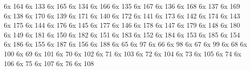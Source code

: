 \characterdef \cyrshha      6x  164
\characterdef \CYRZHDSC     6x  133
\characterdef \cyrzhdsc     6x  165
\characterdef \CYRZDSC      6x  134
\characterdef \cyrzdsc      6x  166
\characterdef \CYRABHDZE    6x  135
\characterdef \cyrabhdze    6x  167
\characterdef \CYRYI        6x  136
\characterdef \cyryi        6x  168
\characterdef \CYRKDSC      6x  137
\characterdef \cyrkdsc      6x  169
\characterdef \CYRKBEAK     6x  138
\characterdef \cyrkbeak     6x  170
\characterdef \CYRKHK       6x  139
\characterdef \cyrkhk       6x  171
\characterdef \CYRLHK       6x  140
\characterdef \cyrlhk       6x  172
\characterdef \CYRNDSC      6x  141
\characterdef \cyrndsc      6x  173
\characterdef \CYRNG        6x  142
\characterdef \cyrng        6x  174
\characterdef \CYRNHK       6x  143
\characterdef \cyrnhk       6x  175
\characterdef \CYROTLD      6x  144
\characterdef \cyrotld      6x  176
\characterdef \CYRSDSC      6x  145
\characterdef \cyrsdsc      6x  177
\characterdef \CYRUSHRT     6x  146
\characterdef \cyrushrt     6x  178
\characterdef \CYRY         6x  147
\characterdef \cyry         6x  179
\characterdef \CYRYHCRS     6x  148
\characterdef \cyryhcrs     6x  180
\characterdef \CYRHDSC      6x  149
\characterdef \cyrhdsc      6x  181
\characterdef \CYRHHK       6x  150
\characterdef \cyrhhk       6x  182
\characterdef \CYRCHLDSC    6x  151
\characterdef \cyrchldsc    6x  183
\characterdef \CYRCHRDSC    6x  152
\characterdef \cyrchrdsc    6x  184
\characterdef \CYRIE        6x  153
\characterdef \cyrie        6x  185
\characterdef \CYRSCHWA     6x  154
\characterdef \cyrschwa     6x  186
\characterdef \CYREPS       6x  155
\characterdef \cyreps       6x  187
\characterdef \CYRYO        6x  156
\characterdef \cyryo        6x  188
\characterdef \CYRAE        6x  65
\characterdef \cyrae        6x  97
\characterdef \CYRDJE       6x  66
\characterdef \cyrdje       6x  98
\characterdef \CYRTSHE      6x  67
\characterdef \cyrtshe      6x  99
\characterdef \CYRABHCH     6x  68
\characterdef \cyrabhch     6x  100
\characterdef \CYRABHCHDSC  6x  69
\characterdef \cyrabhchdsc  6x  101
\characterdef \CYRKVCRS     6x  70
\characterdef \cyrkvcrs     6x  102
\characterdef \CYRKHCRS     6x  71
\characterdef \cyrkhcrs     6x  103
\characterdef \CYRLDSC      6x  72
\characterdef \cyrldsc      6x  104
\characterdef \CYRII        6x  73
\characterdef \cyrii        6x  105
\characterdef \CYRJE        6x  74
\characterdef \cyrje        6x  106
\characterdef \CYRLJE       6x  75
\characterdef \cyrlje       6x  107
\characterdef \CYRMDSC      6x  76
\characterdef \cyrmdsc      6x  108
